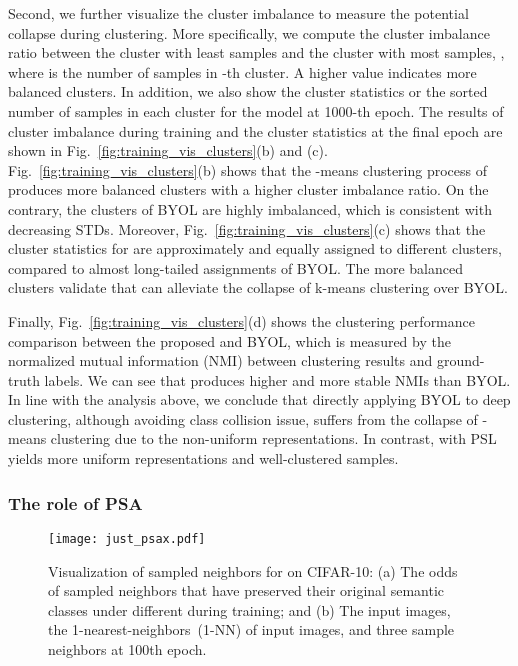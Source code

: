 Second, we further visualize the cluster imbalance to measure the potential collapse during clustering. More specifically, we compute the cluster imbalance ratio between the cluster with least samples and the cluster with most samples, , where  is the number of samples in -th cluster.  A higher value indicates more balanced clusters. In addition, we also show the cluster statistics or the sorted number of samples in each cluster for the model at 1000-th epoch. The results of cluster imbalance during training and the cluster statistics at the final epoch are shown in Fig.~\ref{fig:training_vis_clusters}(b) and (c).   Fig.~\ref{fig:training_vis_clusters}(b) shows that the -means clustering process of \methodname produces more balanced clusters with a higher cluster imbalance ratio. On the contrary, the clusters of BYOL are highly imbalanced, which is consistent with  decreasing STDs.
Moreover, Fig.~\ref{fig:training_vis_clusters}(c) shows that the cluster statistics for \methodname are approximately and equally assigned to different clusters, compared to almost long-tailed assignments of BYOL.
The more balanced clusters validate that \methodname can alleviate the collapse of k-means clustering over BYOL.

Finally, Fig.~\ref{fig:training_vis_clusters}(d) shows the clustering performance comparison between the proposed \methodname and BYOL, which is measured by the normalized mutual information (NMI) between clustering results and ground-truth labels. We can see that \methodname produces higher and more stable NMIs than BYOL. In line with the analysis above, we conclude that directly applying BYOL to deep clustering, although avoiding class collision issue, suffers from the collapse of -means clustering due to the non-uniform representations. In contrast, \methodname with PSL yields more uniform representations and well-clustered samples.

\subsubsection{The role of PSA} 

\begin{figure}[t]
  \centering
  \texttt{[image: just\_psax.pdf]}
  \caption{
    Visualization of sampled neighbors for \methodname on CIFAR-10: (a) The odds of sampled neighbors that have preserved their original semantic classes under different  during training; and (b) The input images, the 1-nearest-neighbors~(1-NN) of input images, and three sample neighbors at 100th epoch.
  }
  \label{fig:just_psa}
\end{figure}

